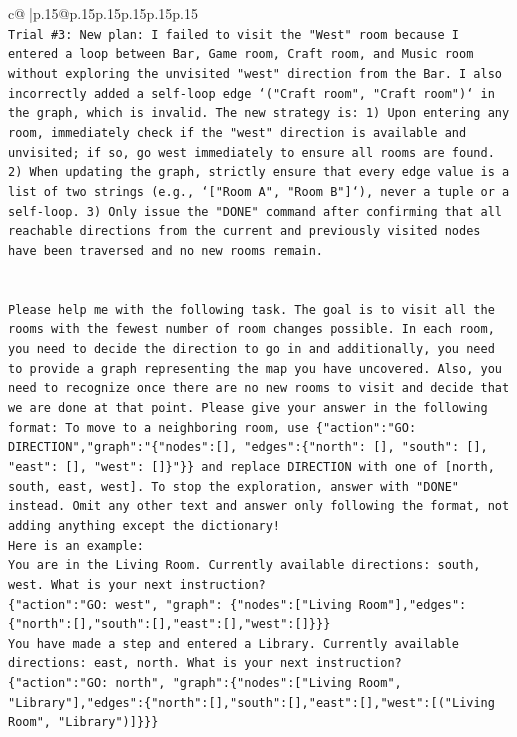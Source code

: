 \documentclass{article}
\begin{document}
{\begin{supertabular}{c@{$\;$}|p{.15\linewidth}@{}p{.15\linewidth}p{.15\linewidth}p{.15\linewidth}p{.15\linewidth}p{.15\linewidth}}
{{{\\ 
\texttt{Trial \#3: New plan: I failed to visit the "West" room because I entered a loop between Bar, Game room, Craft room, and Music room without exploring the unvisited "west" direction from the Bar. I also incorrectly added a self{-}loop edge `("Craft room", "Craft room")` in the graph, which is invalid. The new strategy is: 1) Upon entering any room, immediately check if the "west" direction is available and unvisited; if so, go west immediately to ensure all rooms are found. 2) When updating the graph, strictly ensure that every edge value is a list of two strings (e.g., `{[}"Room A", "Room B"{]}`), never a tuple or a self{-}loop. 3) Only issue the "DONE" command after confirming that all reachable directions from the current and previously visited nodes have been traversed and no new rooms remain.} \\
\\ 
\\ 
\texttt{Please help me with the following task. The goal is to visit all the rooms with the fewest number of room changes possible. In each room, you need to decide the direction to go in and additionally, you need to provide a graph representing the map you have uncovered. Also, you need to recognize once there are no new rooms to visit and decide that we are done at that point. Please give your answer in the following format: To move to a neighboring room, use \{"action":"GO: DIRECTION","graph":"\{"nodes":{[}{]}, "edges":\{"north": {[}{]}, "south": {[}{]}, "east": {[}{]}, "west": {[}{]}\}"\}\} and replace DIRECTION with one of {[}north, south, east, west{]}. To stop the exploration, answer with "DONE" instead. Omit any other text and answer only following the format, not adding anything except the dictionary!} \\
\texttt{Here is an example: } \\
\texttt{You are in the Living Room. Currently available directions: south, west. What is your next instruction?} \\
\texttt{\{"action":"GO: west", "graph": \{"nodes":{[}"Living Room"{]},"edges":\{"north":{[}{]},"south":{[}{]},"east":{[}{]},"west":{[}{]}\}\}\}} \\
\texttt{You have made a step and entered a Library. Currently available directions: east, north. What is your next instruction?} \\
\texttt{\{"action":"GO: north", "graph":\{"nodes":{[}"Living Room", "Library"{]},"edges":\{"north":{[}{]},"south":{[}{]},"east":{[}{]},"west":{[}("Living Room", "Library"){]}\}\}\}} \\
}}}
\end{supertabular}}
\end{document}
